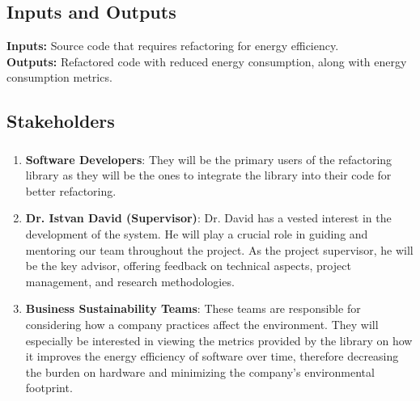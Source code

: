\documentclass{article}
\begin{document}
\subsection{Inputs and Outputs}

\textbf{Inputs:} Source code that requires refactoring for energy efficiency. \\
\textbf{Outputs:} Refactored code with reduced energy consumption, along with energy consumption metrics.

\subsection{Stakeholders}
\subsubsection*{\color{blue}{Direct Stakeholders}}
\begin{enumerate}

    \item \textbf{Software Developers}: They will be the primary users of the refactoring library as they will be the ones to integrate the library into their 
    code for better refactoring.
    \item \textbf{Dr. Istvan David (Supervisor)}: Dr. David has a vested interest in the development of the system. He will play a crucial role in guiding and mentoring our 
    team throughout the project. As the project supervisor, he will be the key advisor, offering feedback on technical aspects, project management, and research methodologies. 
    \item \textbf{Business Sustainability Teams}: These teams are responsible for considering how a company practices affect the environment. They will especially be interested 
    in viewing the metrics provided by the library on how it improves the energy efficiency of software over time, therefore decreasing the burden on hardware and minimizing the 
    company's environmental footprint.

\end{enumerate}
\end{document}

